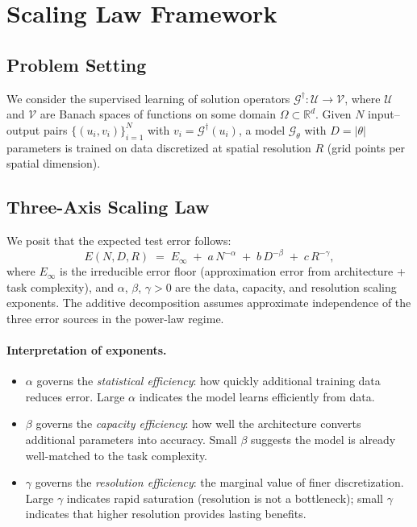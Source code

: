 \documentclass[11pt]{article}
\newcommand{\Einf}{E_\infty}
\begin{document}
\section{Scaling Law Framework}
\label{sec:framework}

\subsection{Problem Setting}
We consider the supervised learning of solution operators
$\mathcal{G}^\dagger : \mathcal{U} \to \mathcal{V}$, where
$\mathcal{U}$ and $\mathcal{V}$ are Banach spaces of functions on
some domain $\Omega \subset \mathbb{R}^d$. Given $N$ input--output
pairs $\{(u_i, v_i)\}_{i=1}^N$ with
$v_i = \mathcal{G}^\dagger(u_i)$, a model $\mathcal{G}_\theta$ with
$D = |\theta|$ parameters is trained on data discretized at spatial
resolution $R$ (grid points per spatial dimension).

\subsection{Three-Axis Scaling Law}
We posit that the expected test error follows:
\begin{equation}
  \label{eq:3d-law}
  E(N, D, R) \;=\; \Einf \;+\;
    a\,N^{-\alpha} \;+\; b\,D^{-\beta} \;+\; c\,R^{-\gamma},
\end{equation}
where $\Einf$ is the irreducible error floor (approximation error from
architecture + task complexity), and $\alpha$, $\beta$, $\gamma > 0$
are the data, capacity, and resolution scaling exponents. The additive
decomposition assumes approximate independence of the three error
sources in the power-law regime.

\paragraph{Interpretation of exponents.}
\begin{itemize}
  \item $\alpha$ governs the \emph{statistical efficiency}: how
    quickly additional training data reduces error. Large $\alpha$
    indicates the model learns efficiently from data.
  \item $\beta$ governs the \emph{capacity efficiency}: how
    well the architecture converts additional parameters into accuracy.
    Small $\beta$ suggests the model is already well-matched to the
    task complexity.
  \item $\gamma$ governs the \emph{resolution efficiency}: the
    marginal value of finer discretization. Large $\gamma$ indicates
    rapid saturation (resolution is not a bottleneck); small $\gamma$
    indicates that higher resolution provides lasting benefits.
\end{itemize}
\end{document}
